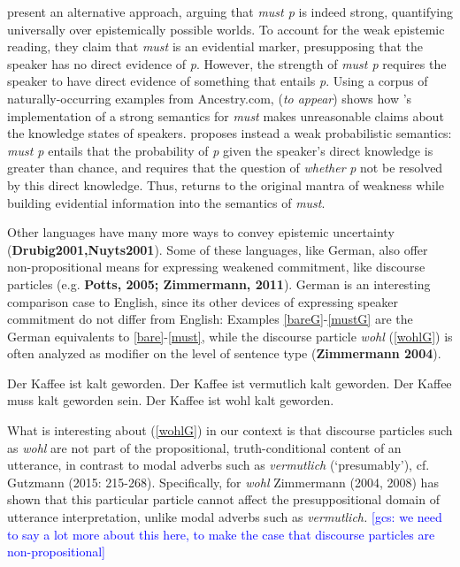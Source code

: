 \documentclass[11pt]{article}
\newcommand{\gcs}[1]{\textcolor{blue}{[gcs: #1]}}
\begin{document}
\cite{vonfintelgillies2010} present an alternative approach, arguing that \emph{must p} is indeed strong, quantifying universally over epistemically possible worlds. To account for the weak epistemic reading, they claim that \emph{must} is an evidential marker, presupposing that the speaker has no direct evidence of \emph{p}. However, the strength of \emph{must p} requires the speaker to have direct evidence of something that entails \emph{p}. Using a corpus of naturally-occurring examples from Ancestry.com, \citeauthor{lassiter2014salt} (\emph{to appear}) shows how \citeauthor{vonfintelgillies2010}'s implementation of a strong semantics for \emph{must} makes unreasonable claims about the knowledge states of speakers. \citeauthor{lassiter2014salt} proposes instead a weak probabilistic semantics: \emph{must p} entails that the probability of \emph{p} given the speaker's direct knowledge is greater than chance, and requires that the question of \emph{whether} \emph{p} not be resolved by this direct knowledge. Thus, \citeauthor{lassiter2014salt} returns to the original mantra of weakness while building evidential information into the semantics of \emph{must}.

Other languages have many more ways to convey epistemic uncertainty (\textbf{Drubig2001,Nuyts2001}). Some of these languages, like German, also offer non-propositional means for expressing weakened commitment, like discourse particles (e.g. \textbf{Potts, 2005; Zimmermann, 2011}). German is an interesting comparison case to English, since its other devices of expressing speaker commitment do not differ from English: Examples \ref{bareG}-\ref{mustG} are the German equivalents to \ref{bare}-\ref{must}, while the discourse particle \emph{wohl} (\ref{wohlG}) is often analyzed as modifier on the level of sentence type (\textbf{Zimmermann 2004}).

\begin{exe}
	\ex\label{german} \begin{xlist}
		\ex\label{bareG} Der Kaffee ist kalt geworden.
		\ex\label{probG} Der Kaffee ist vermutlich kalt geworden.
		\ex\label{mustG} Der Kaffee muss kalt geworden sein. 
		\ex\label{wohlG} Der Kaffee ist wohl kalt geworden.
	\end{xlist}
\end{exe}

What is interesting about (\ref{wohlG}) in our context is that discourse particles such as \emph{wohl} are not part of the propositional, truth-conditional content of an utterance, in contrast to modal adverbs such as \emph{vermutlich} (‘presumably’), cf. Gutzmann (2015: 215-268). Specifically, for \emph{wohl} Zimmermann (2004, 2008) has shown that this particular particle cannot affect the presuppositional domain of utterance interpretation, unlike modal adverbs such as \emph{vermutlich.} \gcs{we need to say a lot more about this here, to make the case that discourse particles are non-propositional}
\end{document}
